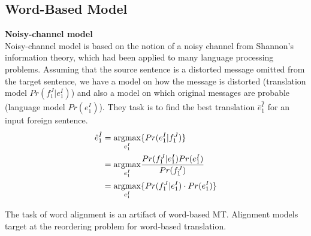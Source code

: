 \subsection{Word-Based Model}
\noindent \textbf{Noisy-channel model}\\
Noisy-channel model is
 based on the notion of a noisy channel from Shannon's information theory, which had been applied to many language processing problems. Assuming that the source sentence is a distorted message omitted from the target sentence, we have a model on  how the message is distorted (translation model $Pr(f_1^J|e_1^I)$) and also a model on which original messages are probable (language model ${Pr(e_1^I)}$). They task is to find the best translation $\hat{e}_1^{\hat{I}}$ for an input foreign sentence.
\begin{align*}
\hat{e}_1^{\hat{I}} & = \underset{e_1^I}{\operatorname{argmax}} \{Pr(e_1^I | f_1^J)\} \\ & = \underset{e_1^I}{\operatorname{argmax}} {\frac{Pr(f_1^J | e_1^I)Pr(e_1^I)}{Pr(f_1^J)}} \\
& = \underset{e_1^I}{\operatorname{argmax}} { \{ Pr(f_1^J | e_1^I) \cdot  Pr(e_1^I)\} }
\end{align*} 

 The task of word alignment is an artifact of word-based MT. Alignment models target at the reordering problem for word-based translation.\\

